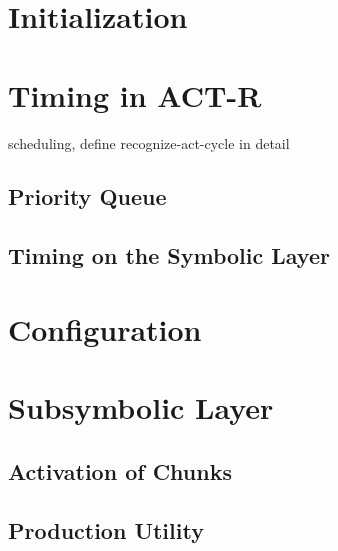 \section{Initialization}


\section{Timing in ACT-R}

scheduling, define recognize-act-cycle in detail

\subsection{Priority Queue}

\subsection{Timing on the Symbolic Layer}

\section{Configuration}


\section{Subsymbolic Layer}

\subsection{Activation of Chunks}

\subsection{Production Utility}

